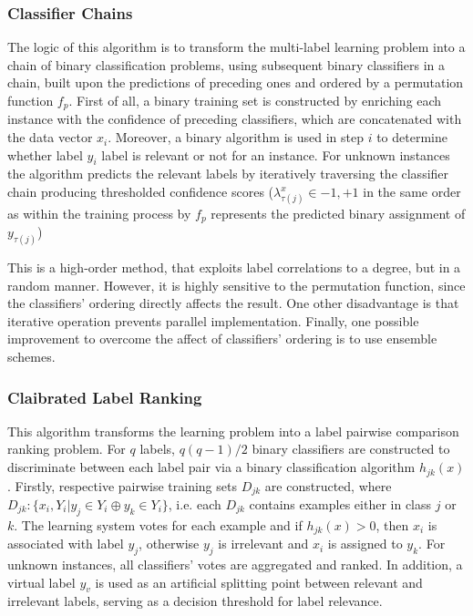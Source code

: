 \documentclass[12pt]{report}
\begin{document}
	\subsubsection*{Classifier Chains}
	The logic of this algorithm is to transform the multi-label learning problem
  into a chain of binary classification problems, using subsequent binary
  classifiers in a chain, built upon the predictions of preceding ones and
  ordered by a permutation function $f_p$. First of all, a binary training set
  is constructed by enriching each instance with the confidence of preceding
  classifiers, which are concatenated with the data vector $x_i$. Moreover, a binary algorithm is used in step $i$ to
  determine whether label $y_i$ label is relevant or not for an instance. For
  unknown instances the algorithm predicts the relevant labels by iteratively
  traversing the classifier chain producing thresholded confidence scores ($\lambda _{\tau(j)}^x \in {-1, +1}$ in the
  same order as within the training process by $f_p$ represents the predicted binary assignment of $y_{\tau(j)}$)
	
	This is a high-order method, that exploits label correlations to a degree, but in a random manner. However, it is highly sensitive to the permutation function, since the classifiers' ordering directly affects the result. One other disadvantage is that iterative operation prevents parallel implementation. Finally, one possible improvement to overcome the affect of classifiers' ordering is to use ensemble schemes.
	
	\subsubsection*{Claibrated Label Ranking}
	This algorithm transforms the learning problem into a label pairwise
  comparison ranking problem. For $q$ labels, $q(q-1)/2$ binary classifiers are
  constructed to discriminate between each label pair via a binary
  classification algorithm $h_{jk}(x)$. Firstly, respective pairwise training
  sets $D_{jk}$ are constructed, where $D_{jk}: \{x_i, Y_i | y_j \in Y_i \oplus
  y_k \in Y_i\}$, i.e. each $D_{jk}$ contains examples either in class $j$ or
  $k$. The learning system votes for each example and if $h_{jk}(x)>0$, then
  $x_i$ is associated with label $y_j$, otherwise $y_j$ is irrelevant and $x_i$
  is assigned to $y_k$. For unknown instances, all classifiers' votes are
  aggregated and ranked. In addition, a virtual label $y_v$ is used as an
  artificial splitting point between relevant and irrelevant labels, serving as
  a decision threshold for label relevance.
	
\end{document}
